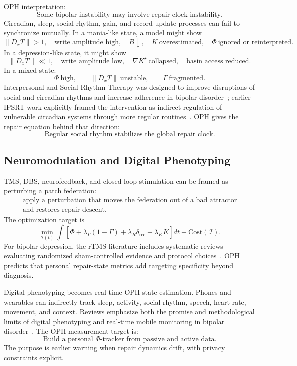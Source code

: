 \documentclass[11pt]{article}
\theoremstyle{remark}
\theoremstyle{plain}
\newcommand{\rec}{\mathrm{rec}}
\begin{document}
OPH interpretation:
\[
\boxed{
\text{Some bipolar instability may involve repair-clock instability.}
}
\]
Circadian, sleep, social-rhythm, gain, and record-update processes can fail to synchronize mutually.
In a mania-like state, a model might show
\[
\|D_xT\|>1,\quad
\text{write amplitude high},\quad
B\downarrow,\quad
K\ \text{overestimated},\quad
\Phi\ \text{ignored or reinterpreted}.
\]
In a depression-like state, it might show
\[
\|D_xT\|\ll1,\quad
\text{write amplitude low},\quad
\nabla K^\star\ \text{collapsed},\quad
\text{basin access reduced}.
\]
In a mixed state:
\[
\Phi\ \text{high},\qquad
\|D_xT\|\ \text{unstable},\qquad
\Gamma\ \text{fragmented}.
\]
Interpersonal and Social Rhythm Therapy was designed to improve disruptions of social and circadian rhythms and increase adherence in bipolar disorder~\cite{Steardo2020IPSRT}; earlier IPSRT work explicitly framed the intervention as indirect regulation of vulnerable circadian systems through more regular routines~\cite{FrankIPSRT2011}. OPH gives the repair equation behind that direction:
\[
\boxed{
\text{Regular social rhythm stabilizes the global repair clock.}
}
\]

\subsection{Neuromodulation and Digital Phenotyping}

TMS, DBS, neurofeedback, and closed-loop stimulation can be framed as perturbing a patch federation:
\[
\boxed{
\begin{gathered}
\text{apply a perturbation that moves the federation out of a bad attractor}\\
\text{and restores repair descent.}
\end{gathered}
}
\]
The optimization target is
\[
\boxed{
\min_{\mathcal I(t)}
\int
\left[
\Phi
+
\lambda_\Gamma(1-\Gamma)
+
\lambda_R\delta_{\rec}
-
\lambda_K\dot K
\right]dt
+
\mathrm{Cost}(\mathcal I).
}
\]
For bipolar depression, the rTMS literature includes systematic reviews evaluating randomized sham-controlled evidence and protocol choices~\cite{Tseng2024RTMS,Ventura2026TMS}. OPH predicts that personal repair-state metrics add targeting specificity beyond diagnosis.

Digital phenotyping becomes real-time OPH state estimation. Phones and wearables can indirectly track sleep, activity, social rhythm, speech, heart rate, movement, and context. Reviews emphasize both the promise and methodological limits of digital phenotyping and real-time mobile monitoring in bipolar disorder~\cite{Orsolini2020DigitalPhenotyping,Dunster2021MobileMonitoring}. The OPH measurement target is:
\[
\boxed{
\text{Build a personal }\Phi\text{-tracker from passive and active data.}
}
\]
The purpose is earlier warning when repair dynamics drift, with privacy constraints explicit.
\end{document}
